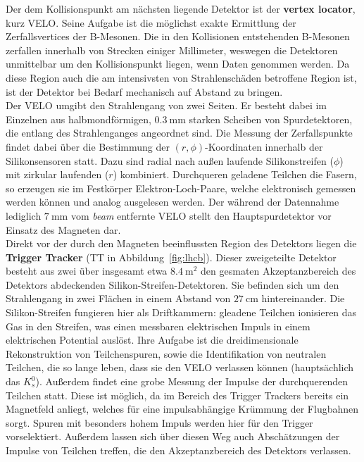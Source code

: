 %
Der dem Kollisionspunkt am nächsten liegende Detektor ist der \textbf{vertex locator}, kurz VELO. Seine Aufgabe ist die möglichst exakte Ermittlung der Zerfallsvertices der B-Mesonen. Die in den Kollisionen entstehenden B-Mesonen zerfallen innerhalb von Strecken einiger Millimeter, weswegen die Detektoren unmittelbar um den Kollisionspunkt liegen, wenn Daten genommen werden\cite{velo}. Da diese Region auch die am intensivsten von Strahlenschäden betroffene Region ist, ist der Detektor bei Bedarf mechanisch auf Abstand zu bringen.\\
Der VELO umgibt den Strahlengang von zwei Seiten. Er besteht dabei im Einzelnen aus halbmondförmigen, $\SI{0.3}{\milli\meter}$ starken Scheiben von Spurdetektoren, die entlang des Strahlenganges angeordnet sind\cite{velo}. Die Messung der Zerfallspunkte findet dabei über die Bestimmung der $(r, \phi)$-Koordinaten innerhalb der Silikonsensoren statt. Dazu sind radial nach außen laufende Silikonstreifen ($\phi$) mit zirkular laufenden ($r$) kombiniert\cite{lhcb}. Durchqueren geladene Teilchen die Fasern, so erzeugen sie im Festkörper Elektron-Loch-Paare, welche elektronisch gemessen werden können und analog ausgelesen werden. Der während der Datennahme lediglich $\SI{7}{\milli\meter}$ vom \textit{beam} entfernte VELO stellt den Hauptspurdetektor vor Einsatz des Magneten dar\cite{velo}. \\

Direkt vor der durch den Magneten beeinflussten Region des Detektors liegen die \textbf{Trigger Tracker} (TT in Abbildung~\ref{fig:lhcb}). Dieser zweigeteilte Detektor besteht aus zwei über insgesamt etwa $\SI{8.4}{\meter\squared}$ den gesmaten Akzeptanzbereich des Detektors abdeckenden Silikon-Streifen-Detektoren\cite{lhcb}. Sie befinden sich um den Strahlengang in zwei Flächen in einem Abstand von $\SI{27}{\centi\meter}$ hintereinander. Die Silikon-Streifen fungieren hier als Driftkammern: gleadene Teilchen ionisieren das Gas in den Streifen, was einen messbaren elektrischen Impuls in einem elektrischen Potential auslöst. Ihre Aufgabe ist die dreidimensionale Rekonstruktion von Teilchenspuren, sowie die Identifikation von neutralen Teilchen, die so lange leben, dass sie den VELO verlassen können (hauptsächlich das $K_s^0$). Außerdem findet eine grobe Messung der Impulse der durchquerenden Teilchen statt. Diese ist möglich, da im Bereich des Trigger Trackers bereits ein Magnetfeld anliegt, welches für eine impulsabhängige Krümmung der Flugbahnen sorgt. Spuren mit besonders hohem Impuls werden hier für den Trigger vorselektiert. Außerdem lassen sich über diesen Weg auch Abschätzungen der Impulse von Teilchen treffen, die den Akzeptanzbereich des Detektors verlassen.\\

